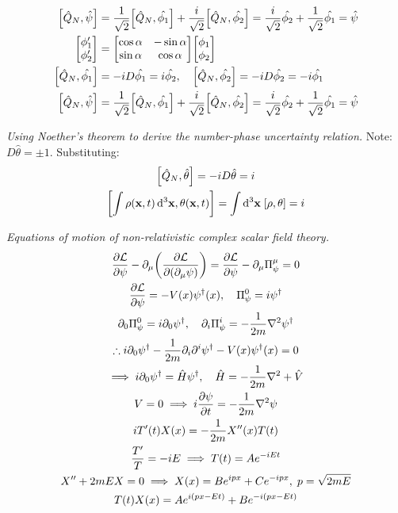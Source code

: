 \documentclass{report}
\begin{document}
\begin{subquests}
\begin{subquests}
		\item
		\begin{align*}
			\bqty{\hat{Q}_N, \hat{\psi}} & = \frac{1}{\sqrt{2}}\bqty{\hat{Q}_N, \hat{\phi_1}} + \frac{i}{\sqrt{2}}\bqty{\hat{Q}_N, \hat{\phi_2}} = \frac{i}{\sqrt{2}}\hat{\phi_2} + \frac{1}{\sqrt{2}}\hat{\phi_1} = \hat{\psi} \\
			\mqty[
				\phi_1' \\
				\phi_2' 
			]
			& = \mqty[
				\cos\alpha & -\sin\alpha \\
				\sin\alpha & \cos\alpha \\
			]\mqty[
				\phi_1 \\
				\phi_2
			] \\
			\bqty{\hat{Q}_N, \hat{\phi_1}} & = -iD\hat{\phi_1} = i\hat{\phi_2},\quad\bqty{\hat{Q}_N, \hat{\phi_2}} = -iD\hat{\phi_2} = -i\hat{\phi_1} \\
			\bqty{\hat{Q}_N, \hat{\psi}} & = \frac{1}{\sqrt{2}}\bqty{\hat{Q}_N, \hat{\phi_1}} + \frac{i}{\sqrt{2}}\bqty{\hat{Q}_N, \hat{\phi_2}} = \frac{i}{\sqrt{2}}\hat{\phi_2} + \frac{1}{\sqrt{2}}\hat{\phi_1} = \hat{\psi}
		\end{align*}
	\end{subquests}
	

	\item \emph{Using Noether's theorem to derive the number-phase uncertainty relation.}
	Note: $D\hat{\theta} = \pm 1$. Substituting:
	\begin{gather*}
		\bqty{\hat{Q}_N, \hat{\theta}} = -iD\hat{\theta} = i \\
		\bqty{\int\rho({\vb x},t)\,\dd^3{\mathbf x}, \theta({\vb x},t)} = \int\dd^3{\vb x}\;\bqty{\rho,\theta} = i
	\end{gather*}

	\item \emph{Equations of motion of non-relativistic complex scalar field theory.}
	\begin{gather*}
		\pdv{\mathcal L}{\psi} - \partial_{\mu}\pqty{\pdv{\mathcal L}{\pqty{\partial_{\mu}\psi}}} = \pdv{\mathcal L}{\psi} - \partial_{\mu}\Pi^{\mu}_{\psi} = 0 \\
		\pdv{\mathcal L}{\psi} = -V(x)\psi^{\dagger}(x), \quad \Pi^0_{\psi} = i\psi^{\dagger} \\
		\partial_0\Pi^0_{\psi} = i\partial_0 \psi^{\dagger}, \quad \partial_i \Pi^i_{\psi} = -\frac{1}{2m}\nabla^2\psi^{\dagger}\\
		\therefore i\partial_0 \psi^{\dagger} -\frac{1}{2m}\partial_i\partial^i\psi^{\dagger} - V(x)\psi^{\dagger}(x) = 0 \\
		\implies i\partial_0\psi^{\dagger} = \hat{H}\psi^{\dagger}, \quad \hat{H} = -\frac{1}{2m}\nabla^2 + \hat{V} \\
		V = 0 \implies i\pdv{\psi}{t} = -\frac{1}{2m}\nabla^2\psi \\
		iT'(t)X(x) = -\frac{1}{2m}X''(x)T(t) \\
		\frac{T'}{T} = -iE \implies T(t) = Ae^{-iEt} \\
		X'' + 2mEX = 0 \implies X(x) = Be^{ipx} + Ce^{-ipx},\; p = \sqrt{2mE} \\
		T(t)X(x) = Ae^{i(px-Et)} + Be^{-i(px - Et)}
	\end{gather*}


\end{subquests}
\end{document}
